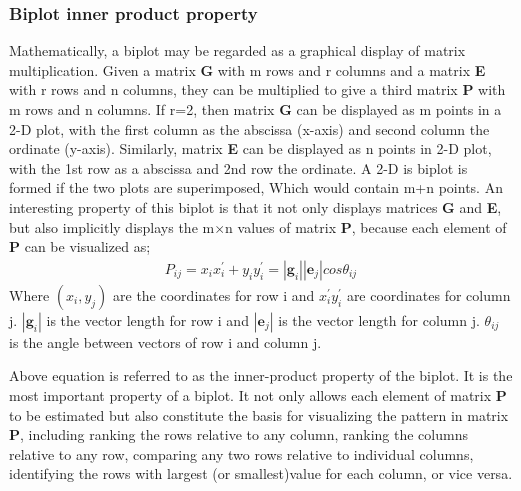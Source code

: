  \subsubsection{Biplot inner product property }
 Mathematically, a biplot may be regarded as a graphical display of matrix multiplication. Given a matrix \textbf{G} with m rows and r columns and a matrix \textbf{E} with r rows and n columns, they can be multiplied to give a third matrix \textbf{P} with m rows and n columns. If r=2, then matrix \textbf{G} can be displayed as m points in a 2-D plot, with the first column as the abscissa (x-axis) and second column the ordinate (y-axis). Similarly, matrix \textbf{E} can be displayed as n points in 2-D plot, with the 1st row as a abscissa and 2nd row the ordinate. A 2-D is biplot is formed if the two plots are superimposed, Which would contain m+n points. An interesting property of this biplot is that it not only displays matrices \textbf{G} and \textbf{E}, but also implicitly displays the m$\times$n values of matrix \textbf{P}, because each element of \textbf{P} can be visualized as;
 \begin{eqnarray}
 P_{ij}=x_ix_i^\prime+y_iy_i^\prime=|\textbf{g}_i||\textbf{e}_j|cos\theta_{ij}
 \end{eqnarray}     
 Where $(x_i,y_j)$ are the coordinates for row i and $x_i^\prime y_i^\prime$ are coordinates for column j. $|\textbf{g}_i|$ is the vector length for row i and $ |\textbf{e}_j|$ is the vector length for column j. $\theta_{ij}$ is the angle between vectors of row i and column j.
 
 Above equation is referred to as the inner-product property of the biplot. It is the most important property of a biplot. It not only allows each element of matrix \textbf{P} to be estimated but also constitute the basis for visualizing the pattern in matrix \textbf{P}, including ranking the rows relative to any column, ranking the columns relative to any row, comparing any two rows relative to individual columns, identifying the rows with largest (or smallest)value for each column, or vice versa.
